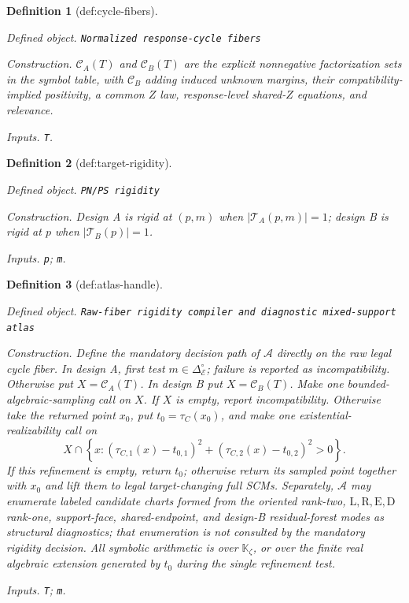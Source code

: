 \documentclass{article}
\newtheorem{definition}{Definition}
\begin{document}
\begin{definition}[def:cycle-fibers]\label{def:cycle-fibers}
\par\smallskip\noindent\emph{Defined object.} \texttt{Normalized response-\allowbreak{}cycle fibers}
\par\smallskip\noindent\emph{Construction.} \(\mathcal C_A(T)\) and \(\mathcal C_B(T)\) are the explicit nonnegative factorization sets in the symbol table, with \(\mathcal C_B\) adding induced unknown margins, their compatibility-implied positivity, a common \(Z\) law, response-level shared-\(Z\) equations, and relevance.
\par\smallskip\noindent\emph{Inputs.} \texttt{T}.
\end{definition}

\begin{definition}[def:target-rigidity]\label{def:target-rigidity}
\par\smallskip\noindent\emph{Defined object.} \texttt{PN/\allowbreak{}PS rigidity}
\par\smallskip\noindent\emph{Construction.} Design A is rigid at \((p,m)\) when \(|\mathcal T_A(p,m)|=1\); design B is rigid at \(p\) when \(|\mathcal T_B(p)|=1\).
\par\smallskip\noindent\emph{Inputs.} \texttt{p}; \texttt{m}.
\end{definition}

\begin{definition}[def:atlas-handle]\label{def:atlas-handle}
\par\smallskip\noindent\emph{Defined object.} \texttt{Raw-\allowbreak{}fiber rigidity compiler and diagnostic mixed-\allowbreak{}support atlas}
\par\smallskip\noindent\emph{Construction.} Define the mandatory decision path of \(\mathscr A\) directly on the raw legal cycle fiber.  In design A, first test \(m\in\Delta_{\mathcal E}^{\circ}\); failure is reported as incompatibility.  Otherwise put \(X=\mathcal C_A(T)\).  In design B put \(X=\mathcal C_B(T)\).  Make one bounded-algebraic-sampling call on \(X\).  If \(X\) is empty, report incompatibility.  Otherwise take the returned point \(x_0\), put \(t_0=\tau_C(x_0)\), and make one existential-realizability call on
\[
X\cap\left\{x:
(\tau_{C,1}(x)-t_{0,1})^2+(\tau_{C,2}(x)-t_{0,2})^2>0
\right\}.
\]
If this refinement is empty, return \(t_0\); otherwise return its sampled point together with \(x_0\) and lift them to legal target-changing full SCMs.  Separately, \(\mathscr A\) may enumerate labeled candidate charts formed from the oriented rank-two, \(\mathrm L,\mathrm R,\mathrm E,\mathrm D\) rank-one, support-face, shared-endpoint, and design-B residual-forest modes as structural diagnostics; that enumeration is not consulted by the mandatory rigidity decision.  All symbolic arithmetic is over \(\mathbb K_{\zeta}\), or over the finite real algebraic extension generated by \(t_0\) during the single refinement test.
\par\smallskip\noindent\emph{Inputs.} \texttt{T}; \texttt{m}.
\end{definition}
\end{document}
